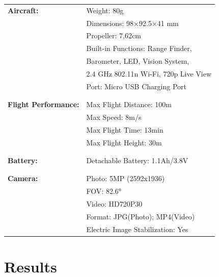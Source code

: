 \documentclass[a4paper,11pt,singlespacing]{article}
\begin{document}
\begin{center}
	\begin{tabular}{ l  l} 
	 \textbf{Aircraft:} & Weight: 80g\\
	 & Dimensions: 98×92.5×41 mm  \\
	 & Propeller: 7,62cm\\
	 & Built-in Functions: Range Finder,\\
	 & Barometer, LED, Vision System,\\
	 & 2.4 GHz 802.11n Wi-Fi, 720p Live View\\
	 & Port: Micro USB Charging Port\\\\
	 \hline
	\\
	 \textbf{Flight Performance:} & Max Flight Distance: 100m\\
	 & Max Speed: 8m/s\\
	 & Max Flight Time: 13min\\
	 & Max Flight Height: 30m\\\\
	 \hline
	 \\
	 \textbf{Battery:} & Detachable Battery: 1.1Ah/3.8V\\\\
	 \hline
	 \\
	 \textbf{Camera:} & Photo: 5MP (2592x1936)\\
	 & FOV: 82.6° \\
	 & Video: HD720P30\\
	 & Format: JPG(Photo); MP4(Video)\\
	 & Electric Image Stabilization: Yes
	\end{tabular}
\end{center}


\section{Results}


\pagebreak
\listoffigures
\pagebreak
\printbibliography[heading=bibintoc]
\pagebreak
\lstlistoflistings
\pagebreak



\end{document}
